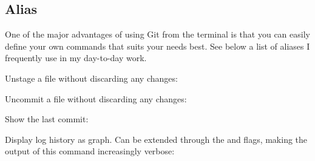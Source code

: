 \begin{flushleft}
\end{flushleft}

\subsection{Alias}

\begin{flushleft}
	One of the major advantages of using Git from the terminal is that you can easily
	define your own commands that suits your needs best. See below a list of aliases
	I frequently use in my day-to-day work.
\end{flushleft}

\begin{flushleft}
	Unstage a file without discarding any changes:
\end{flushleft}

\begin{flushleft}
\end{flushleft}

\begin{flushleft}
	Uncommit a file without discarding any changes:
\end{flushleft}

\begin{flushleft}
\end{flushleft}

\begin{flushleft}
	Show the last commit:
\end{flushleft}

\begin{flushleft}
\end{flushleft}

\begin{flushleft}
	Display log history as graph. Can be extended through the 
	and  flags, making the output of this command increasingly verbose:
\end{flushleft}

\begin{flushleft}
	\hbox{}
\end{flushleft}

